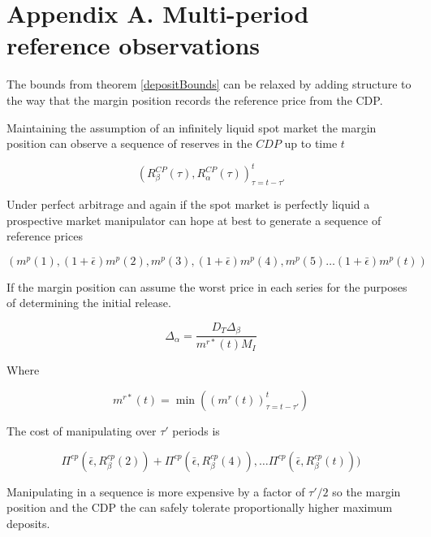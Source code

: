 \documentclass[12pt]{article}
\begin{document}




\clearpage

\section*{Appendix A. Multi-period reference observations} \label{sec:appendixa}

The bounds from theorem \ref{depositBounds} can be relaxed by adding structure to the way that the margin position records the reference price from the CDP.

Maintaining the assumption of an infinitely liquid spot market the margin position can observe a sequence of reserves in the $CDP$ up to time $t$

\[\left(R_\beta^{CP}(\tau), R_\alpha^{CP}(\tau)\right)_{\tau=t-\tau'}^t \]

Under perfect arbitrage and again if the spot market is perfectly liquid a prospective market manipulator can hope at best to generate a sequence of reference prices

\[\left(m^p(1), (1+\bar{\epsilon})m^p(2), m^p(3), (1+\bar{\epsilon})m^p(4), m^p(5) \ldots (1+\bar{\epsilon})m^p(t)
\right) \]

If the margin position can assume the worst price in each series for the purposes of determining the initial release.

\[\Delta_\alpha = \frac{D_T \Delta_\beta}{m^{r*}(t) M_I }\]

Where 

\[ m^{r*}(t) = \min((m^r(t))_{\tau=t-\tau'}^t  ) \]

The cost of manipulating over $\tau'$ periods is 

\[ \Pi^{cp}(\bar{\epsilon}, R_\beta^{cp}(2)) + \Pi^{cp}(\bar{\epsilon}, R_\beta^{cp}(4)), \ldots \Pi^{cp}(\bar{\epsilon}, R_\beta^{cp}(t))) \]

Manipulating in a sequence is more expensive by a factor of $\tau'/2$  so the margin position and the CDP the can safely tolerate proportionally higher maximum deposits.


\end{document}
